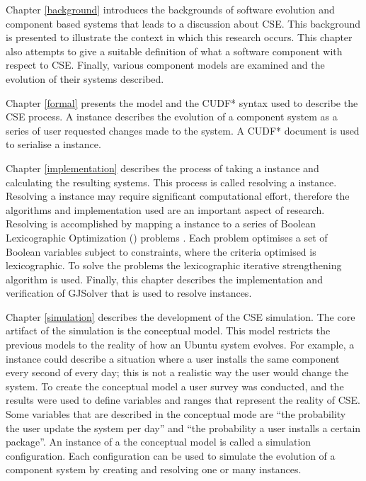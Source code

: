 Chapter \ref{background} introduces the backgrounds of software evolution and component based systems that leads to a discussion about CSE.
This background is presented to illustrate the context in which this research occurs.
This chapter also attempts to give a suitable definition of what a software component with respect to CSE.
Finally, various component models are examined and the evolution of their systems described.

Chapter \ref{formal} presents the \modelname model and the CUDF* syntax used to describe the CSE process.
A \modelname instance describes the evolution of a component system as a series of user requested changes made to the system.
A CUDF* document is used to serialise a \modelname instance.

Chapter \ref{implementation} describes the process of taking a \modelname instance and calculating the resulting systems.
This process is called resolving a \modelname instance.
Resolving a \modelname instance may require significant computational effort,
therefore the algorithms and implementation used are an important aspect of research.
Resolving is accomplished by mapping a \modelname instance to a series of Boolean Lexicographic Optimization (\modelimpl) problems \cite{marque2011blex}.
Each \modelimpl problem optimises a set of Boolean variables subject to constraints, where the criteria optimised is lexicographic.
To solve the \modelimpl problems the lexicographic iterative strengthening algorithm is used.
Finally, this chapter describes the implementation and verification of GJSolver that is used to resolve \modelname instances.

Chapter \ref{simulation} describes the development of the CSE simulation.
The core artifact of the simulation is the conceptual model. 
This model restricts the previous models to the reality of how an Ubuntu system evolves.
For example, a \modelname instance could describe a situation where a user installs the same component every second of every day;
this is not a realistic way the user would change the system.
To create the conceptual model a user survey was conducted, and the results were used to define variables and ranges that represent the reality of CSE.
Some variables that are described in the conceptual mode are ``the probability the user update the system per day'' and ``the probability a user installs a certain package''.
An instance of a the conceptual model is called a simulation configuration.
Each configuration can be used to simulate the evolution of a component system by creating and resolving one or many \modelname instances.

